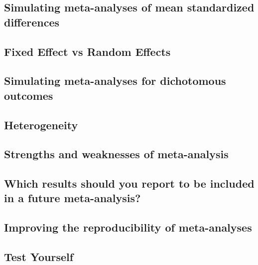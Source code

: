 \documentclass[
  oneside]{krantz}
\begin{document}
\hypertarget{simulating-meta-analyses-of-mean-standardized-differences}{%
\subsection{Simulating meta-analyses of mean standardized
differences}\label{simulating-meta-analyses-of-mean-standardized-differences}}

\hypertarget{fixed-effect-vs-random-effects}{%
\subsection{Fixed Effect vs Random
Effects}\label{fixed-effect-vs-random-effects}}

\hypertarget{simulating-meta-analyses-for-dichotomous-outcomes}{%
\subsection{Simulating meta-analyses for dichotomous
outcomes}\label{simulating-meta-analyses-for-dichotomous-outcomes}}

\hypertarget{heterogeneity}{%
\subsection{Heterogeneity}\label{heterogeneity}}

\hypertarget{strengths-and-weaknesses-of-meta-analysis}{%
\subsection{Strengths and weaknesses of
meta-analysis}\label{strengths-and-weaknesses-of-meta-analysis}}

\hypertarget{which-results-should-you-report-to-be-included-in-a-future-meta-analysis}{%
\subsection{Which results should you report to be included in a future
meta-analysis?}\label{which-results-should-you-report-to-be-included-in-a-future-meta-analysis}}

\hypertarget{metareporting}{%
\subsection{Improving the reproducibility of
meta-analyses}\label{metareporting}}

\hypertarget{test-yourself-9}{%
\subsection{Test Yourself}\label{test-yourself-9}}
\end{document}
